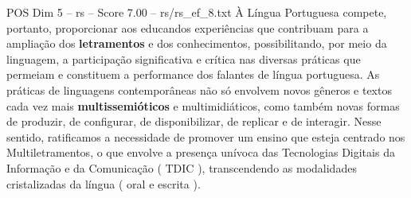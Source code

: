 \begin{textsample}{POS Dim 5 – rs – Score 7.00 – rs/rs\_ef\_8.txt}
À Língua Portuguesa compete, portanto, proporcionar aos educandos experiências que contribuam para a ampliação dos \textbf{letramentos} e dos conhecimentos, possibilitando, por meio da linguagem, a participação significativa e crítica nas diversas práticas que permeiam e constituem a performance dos falantes de língua portuguesa.
As práticas de linguagens contemporâneas não só envolvem novos gêneros e textos cada vez mais \textbf{multissemióticos} e multimidiáticos, como também novas formas de produzir, de configurar, de disponibilizar, de replicar e de interagir.
Nesse sentido, ratificamos a necessidade de promover um ensino que esteja centrado nos Multiletramentos, o que envolve a presença unívoca das Tecnologias Digitais da Informação e da Comunicação ( TDIC ), transcendendo as modalidades cristalizadas da língua ( oral e escrita ).

\end{textsample}

